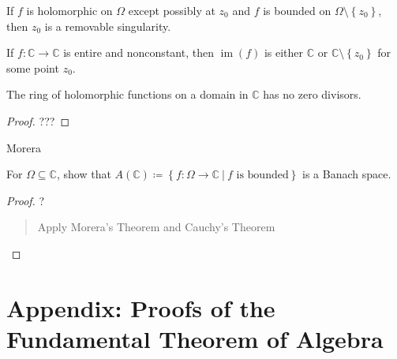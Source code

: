\begin{theorem}

If \(f\) is holomorphic on \(\Omega\) except possibly at \(z_0\) and
\(f\) is bounded on \(\Omega\setminus\left\{{z_0}\right\}\), then
\(z_0\) is a removable singularity.

\end{theorem}

\begin{theorem}

If \(f:{\mathbb{C}}\to {\mathbb{C}}\) is entire and nonconstant, then
\(\operatorname{im}(f)\) is either \({\mathbb{C}}\) or
\({\mathbb{C}}\setminus\left\{{z_0}\right\}\) for some point \(z_0\).

\end{theorem}


\begin{corollary}

The ring of holomorphic functions on a domain in \({\mathbb{C}}\) has no
zero divisors.

\end{corollary}

\begin{proof}

???

\end{proof}


Morera

\begin{proposition}

For \(\Omega\subseteq{\mathbb{C}}\), show that
\(A({\mathbb{C}})\coloneqq\left\{{f: \Omega \to {\mathbb{C}}{~\mathrel{\Big|}~}f\text{ is bounded}}\right\}\)
is a Banach space.

\end{proposition}

\begin{proof}

?

\begin{quote}
Apply Morera's Theorem and Cauchy's Theorem
\end{quote}

\end{proof}

\hypertarget{appendix-proofs-of-the-fundamental-theorem-of-algebra}{%
\section{Appendix: Proofs of the Fundamental Theorem of
Algebra}\label{appendix-proofs-of-the-fundamental-theorem-of-algebra}}

